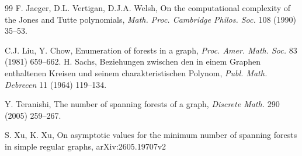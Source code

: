 \documentclass[11pt, a4paper]{article}
\theoremstyle{plain}
\begin{document}
\begin{thebibliography}{99}
F. Jaeger, D.L. Vertigan, D.J.A. Welsh, On the computational complexity of the Jones and Tutte polynomials,  {\em Math. Proc. Cambridge Philos. Soc. } 108 (1990) 35--53.

C.J. Liu, Y. Chow, Enumeration of forests in a graph,  {\em Proc. Amer. Math. Soc. } 83 (1981) 659--662.
H. Sachs, Beziehungen zwischen den in einem Graphen enthaltenen Kreisen und seinem charakteristischen Polynom,  {\em Publ. Math. Debrecen }11 (1964) 119--134.

Y. Teranishi, The number of spanning forests of a graph, {\em Discrete Math. } 290 (2005) 259--267.

S. Xu, K. Xu, On asymptotic values for the minimum number of spanning
forests in simple regular graphs,  arXiv:2605.19707v2


\date{}


\end{thebibliography}
\end{document}
